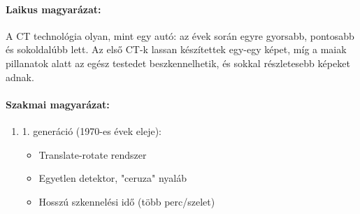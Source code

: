 \documentclass[a4paper,12pt]{article}
\begin{document}
\paragraph{Laikus magyarázat:} A CT technológia olyan, mint egy autó: az évek során egyre gyorsabb, pontosabb és sokoldalúbb lett. Az első CT-k lassan készítettek egy-egy képet, míg a maiak pillanatok alatt az egész testedet beszkennelhetik, és sokkal részletesebb képeket adnak.

\paragraph{Szakmai magyarázat:} \begin{enumerate} \item 1. generáció (1970-es évek eleje): \begin{itemize} \item Translate-rotate rendszer \item Egyetlen detektor, "ceruza" nyaláb \item Hosszú szkennelési idő (több perc/szelet) \end{itemize}


\end{enumerate}
\end{document}
